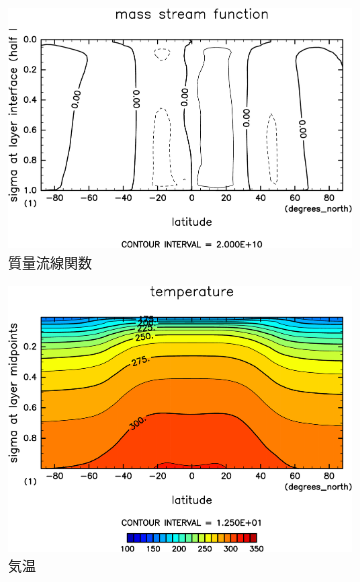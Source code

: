\documentclass[body]{subfiles}
\begin{document}
\begin{figure}[t]
\begin{subfigure}{.4\textwidth}
		\centering
		\includegraphics[width=\columnwidth]{S1800/MSF,time=3650:4015-crop-rotate.pdf}
		\caption{質量流線関数\hmu*{[kg/s]}}\label{S1800質量流線関数}
	\end{subfigure}
	\begin{subfigure}{.4\textwidth}
		\centering
		\includegraphics[width=\columnwidth]{S1800/Temp,time=3650:4015-crop-rotate.pdf}
		\caption{気温\hmu*{[K]}}\label{S1800気温分布}
	\end{subfigure}
	\begin{subfigure}{.4\textwidth}
		\centering

\end{subfigure}
\end{figure}
\end{document}

